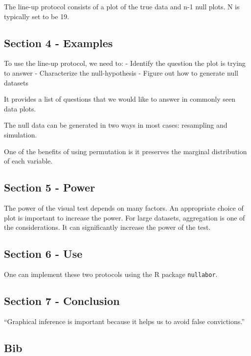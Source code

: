\documentclass[
]{book}
\begin{document}
The line-up protocol consists of a plot of the true data and n-1 null plots. N is typically set to be 19.

\hypertarget{section-4---examples}{%
\subsection{Section 4 - Examples}\label{section-4---examples}}

To use the line-up protocol, we need to:
- Identify the question the plot is trying to answer
- Characterize the null-hypothesis
- Figure out how to generate null datasets

It provides a list of questions that we would like to answer in commonly seen data plots.

The null data can be generated in two ways in most cases: resampling and simulation.

One of the benefits of using permutation is it preserves the marginal distribution of each variable.

\hypertarget{section-5---power}{%
\subsection{Section 5 - Power}\label{section-5---power}}

The power of the visual test depends on many factors. An appropriate choice of plot is important to increase the power. For large datasets, aggregation is one of the considerations. It can significantly increase the power of the test.

\hypertarget{section-6---use}{%
\subsection{Section 6 - Use}\label{section-6---use}}

One can implement these two protocols using the R package \texttt{nullabor}.

\hypertarget{section-7---conclusion}{%
\subsection{Section 7 - Conclusion}\label{section-7---conclusion}}

``Graphical inference is important because it helps us to avoid false convictions.''

\hypertarget{bib}{%
\subsection{Bib}\label{bib}}
\end{document}
